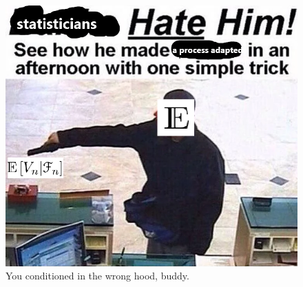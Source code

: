 \documentclass{report}
\begin{document}
\begin{figure}[h]
	\centering
	\includegraphics[width=0.7\linewidth]{screenshot009}
	\caption{You conditioned in the wrong hood, buddy.}
	\label{fig:screenshot009}
\end{figure}
\end{document}
